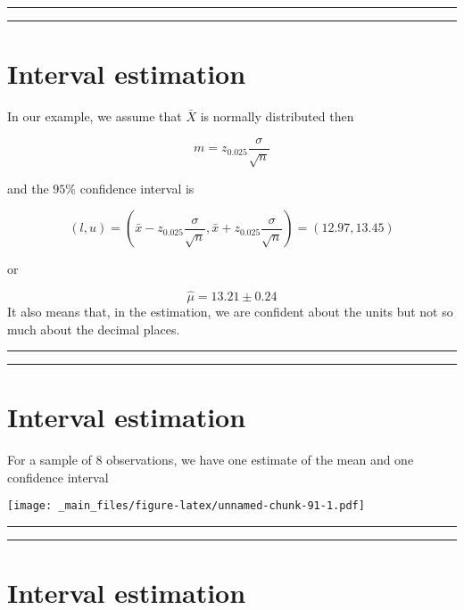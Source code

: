 \documentclass[
]{book}
\begin{document}
\begin{center}\rule{0.5\linewidth}{0.5pt}\end{center}

\begin{center}\rule{0.5\linewidth}{0.5pt}\end{center}

\hypertarget{interval-estimation-4}{%
\section{Interval estimation}\label{interval-estimation-4}}

In our example, we assume that \(\bar{X}\) is normally distributed then

\[m=z_{0.025} \frac{\sigma}{\sqrt{n}}\]

and the \(95\%\) confidence interval is

\[(l,u)=(\bar{x}-z_{0.025} \frac{\sigma}{\sqrt{n}}, \bar{x}+z_{0.025} \frac{\sigma}{\sqrt{n}})= (12.97,13.45)\]

or

\[\hat{\mu}=13.21 \pm 0.24\]
It also means that, in the estimation, we are confident about the units but not so much about the decimal places.

\begin{center}\rule{0.5\linewidth}{0.5pt}\end{center}

\begin{center}\rule{0.5\linewidth}{0.5pt}\end{center}

\hypertarget{interval-estimation-5}{%
\section{Interval estimation}\label{interval-estimation-5}}

For a sample of 8 observations, we have one estimate of the mean and one confidence interval

\texttt{[image: \_main\_files/figure-latex/unnamed-chunk-91-1.pdf]}

\begin{center}\rule{0.5\linewidth}{0.5pt}\end{center}

\begin{center}\rule{0.5\linewidth}{0.5pt}\end{center}

\hypertarget{interval-estimation-6}{%
\section{Interval estimation}\label{interval-estimation-6}}
\end{document}
